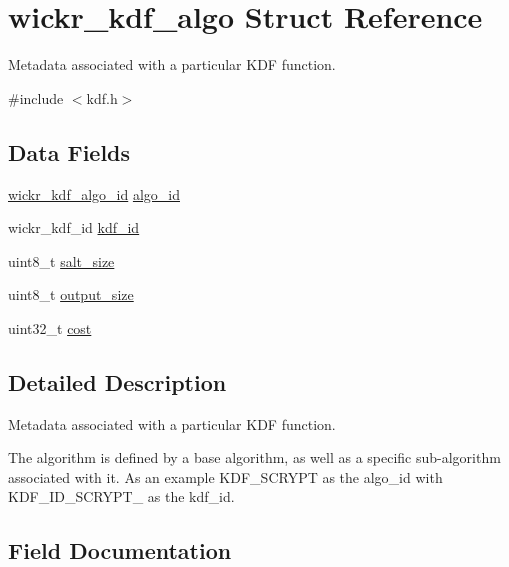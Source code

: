 \hypertarget{structwickr__kdf__algo}{}\section{wickr\+\_\+kdf\+\_\+algo Struct Reference}
\label{structwickr__kdf__algo}


Metadata associated with a particular K\+DF function.  




{\ttfamily \#include $<$kdf.\+h$>$}

\subsection*{Data Fields}
\begin{DoxyCompactItemize}
\item 
\mbox{\hyperlink{group__wickr__kdf_ga106149e3507106abb6b5be843a4e7c16}{wickr\+\_\+kdf\+\_\+algo\+\_\+id}} \mbox{\hyperlink{structwickr__kdf__algo_a1bc420e2ca0f36169e261205bf6246e9}{algo\+\_\+id}}
\item 
wickr\+\_\+kdf\+\_\+id \mbox{\hyperlink{structwickr__kdf__algo_a0cf9976901115634ddbb6193b6e326ba}{kdf\+\_\+id}}
\item 
uint8\+\_\+t \mbox{\hyperlink{structwickr__kdf__algo_a9a6ccf9787e16898d1724292dab6593e}{salt\+\_\+size}}
\item 
uint8\+\_\+t \mbox{\hyperlink{structwickr__kdf__algo_a75e5396b3c53817c6799dbf3107e36d6}{output\+\_\+size}}
\item 
uint32\+\_\+t \mbox{\hyperlink{structwickr__kdf__algo_a3591ba4f7b6b916381ad28327a67d08c}{cost}}
\end{DoxyCompactItemize}


\subsection{Detailed Description}
Metadata associated with a particular K\+DF function. 

The algorithm is defined by a base algorithm, as well as a specific sub-\/algorithm associated with it. As an example K\+D\+F\+\_\+\+S\+C\+R\+Y\+PT as the algo\+\_\+id with K\+D\+F\+\_\+\+I\+D\+\_\+\+S\+C\+R\+Y\+P\+T\+\_ as the kdf\+\_\+id. 

\subsection{Field Documentation}
\mbox{\label{structwickr__kdf__algo_a1bc420e2ca0f36169e261205bf6246e9}} 
